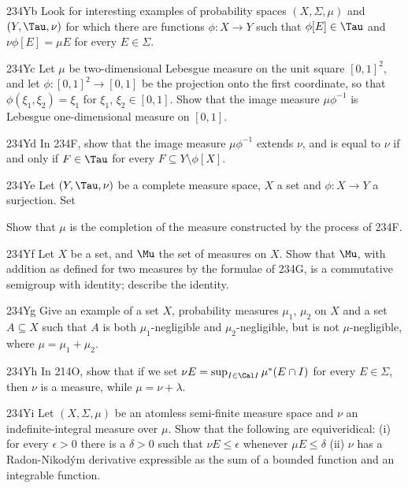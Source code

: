 {\spheader 234Yb
Look for interesting examples of probability spaces
$(X,\Sigma,\mu)$ and $(Y,\Tau,\nu)$ for which there are functions
$\phi:X\to Y$ such that $\phi[E]\in\Tau$ and $\nu\phi[E]=\mu E$ for every
$E\in\Sigma$.   

\spheader 234Yc
Let $\mu$ be
two-dimensional Lebesgue measure on the unit square $[0,1]^2$, and let
$\phi:[0,1]^2\to[0,1]$ be the projection onto the first coordinate, so that
$\phi(\xi_1,\xi_2)=\xi_1$ for $\xi_1$, $\xi_2\in[0,1]$.   Show that the
image measure $\mu\phi^{-1}$ is Lebesgue
one-dimensional measure on $[0,1]$.

\spheader 234Yd
In 234F, show that the image measure $\mu\phi^{-1}$
extends $\nu$, and is equal to $\nu$ if and only if $F\in\Tau$ for
every $F\subseteq Y\setminus\phi[X]$.

\spheader 234Ye
 Let $(Y,\Tau,\nu)$ be a complete measure space, $X$ a set
and $\phi:X\to Y$ a surjection.   Set


\noindent Show that $\mu$ is the
completion of the measure constructed by the process of 234F.

\spheader 234Yf
Let $X$ be a set, and $\Mu$ the set of measures on $X$.
Show that $\Mu$, with addition as defined for two measures by the formulae
of 234G, is a commutative semigroup with identity;  describe the identity.

\spheader 234Yg
Give an example of a set $X$, probability measures
$\mu_1$, $\mu_2$ on $X$ and a set $A\subseteq X$ such that $A$ is
both $\mu_1$-negligible and $\mu_2$-negligible, but is not
$\mu$-negligible, where $\mu=\mu_1+\mu_2$.

\spheader 234Yh
In 214O, show that if we set
$\nu E=\sup_{I\in\Cal I}\mu^*(E\cap I)$ for every $E\in\Sigma$, then
$\nu$ is a measure, while $\mu=\nu+\lambda$.

\spheader 234Yi
 Let $(X,\Sigma,\mu)$ be an atomless semi-finite measure
space and
$\nu$ an indefinite-integral measure over $\mu$.   Show that the
following are equiveridical:  (i) for every $\epsilon>0$ there is a
$\delta>0$ such that $\nu E\le\epsilon$ whenever $\mu E\le\delta$ (ii)
$\nu$ has a Radon-Nikod\'ym derivative expressible as the sum of a
bounded function and an integrable function.

}
